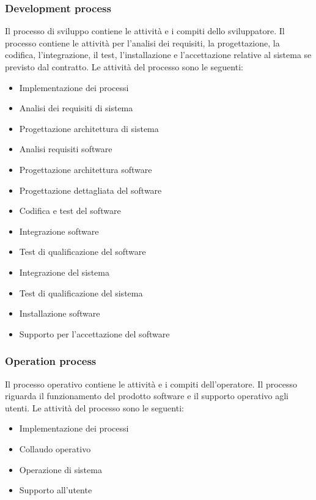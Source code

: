 \subsubsection{Development process}
Il processo di sviluppo contiene le attività e i compiti dello sviluppatore.
Il processo contiene le attività per l'analisi dei requisiti, la progettazione, la codifica, l'integrazione, il test, l'installazione e l'accettazione relative al sistema se previsto dal contratto.
Le attività del processo sono le seguenti:
\begin{itemize}
\item Implementazione dei processi
\item Analisi dei requisiti di sistema
\item Progettazione architettura di sistema
\item Analisi requisiti software
\item Progettazione architettura software
\item Progettazione dettagliata del software
\item Codifica e test del software
\item Integrazione software
\item Test di qualificazione del software
\item Integrazione del sistema 
\item Test di qualificazione del sistema 
\item Installazione software
\item Supporto per l'accettazione del software
\end{itemize}

\subsubsection{Operation process}
Il processo operativo contiene le attività e i compiti dell'operatore. Il processo riguarda il funzionamento del prodotto software e il supporto operativo agli utenti. 
Le attività del processo sono le seguenti:
\begin{itemize}
\item Implementazione dei processi
\item Collaudo operativo
\item Operazione di sistema
\item Supporto all'utente
\end{itemize}

